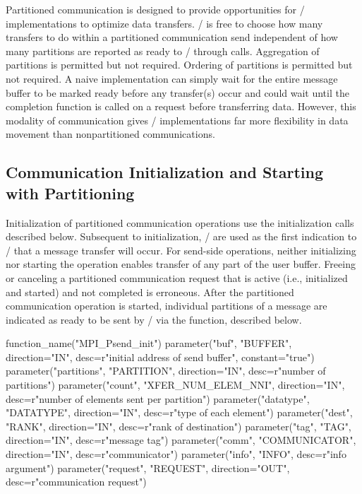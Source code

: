 \begin{rationale}
Partitioned communication is designed to provide opportunities for \MPI/ implementations to
optimize data transfers. \MPI/ is free to choose how many transfers to do within a partitioned communication send
independent of how many partitions are reported as ready to \MPI/ through
 calls.
Aggregation of partitions is permitted but not required.  Ordering of partitions  is permitted but not required.
A naive implementation can simply
wait for the entire message buffer to be marked ready before any transfer(s) occur and
could wait until the completion function is called on a request before transferring data.
However, this modality of communication gives \MPI/ implementations far more flexibility in data
movement than
nonpartitioned communications.
\end{rationale}

\subsection{Communication Initialization and Starting with Partitioning}
\label{sec:part_comm_init}
%
Initialization of partitioned communication operations use the initialization calls described below.
Subsequent to initialization, / are used as the first indication
to \MPI/ that a message transfer will occur.
For send-side operations,
neither initializing nor starting the operation enables 
transfer of any part of the user buffer.
Freeing or canceling a partitioned communication request that is active (i.e., initialized and
started) and not completed is erroneous.
After the partitioned communication operation is started, individual partitions of a 
message are indicated as ready to be sent by \MPI/ via the 
function, described below.

\begin{mpi-binding}
    function_name("MPI_Psend_init")
    parameter("buf", "BUFFER", direction="IN", desc=r"initial address of send buffer", constant="true")
    parameter("partitions", "PARTITION", direction="IN", desc=r"number of partitions")
    parameter("count", "XFER_NUM_ELEM_NNI", direction="IN", desc=r"number of elements sent per partition")
    parameter("datatype", "DATATYPE", direction="IN", desc=r"type of each element")
    parameter("dest", "RANK", direction="IN", desc=r"rank of destination")
    parameter("tag", "TAG", direction="IN", desc=r"message tag")
    parameter("comm", "COMMUNICATOR", direction="IN", desc=r"communicator")
    parameter("info", "INFO", desc=r"info argument")
    parameter("request", "REQUEST", direction="OUT", desc=r"communication request")
\end{mpi-binding}

